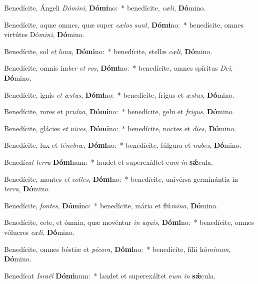 \item Benedícite, Ángeli \textit{Dó}\textit{mi}\textit{ni}, \textbf{Dó}\textbf{mi}no:~* benedícite, \textit{cæ}\textit{li}, \textbf{Dó}mino.
\item Benedícite, aquæ omnes, quæ super \textit{cæ}\textit{los} \textit{sunt}, \textbf{Dó}\textbf{mi}no:~* benedícite, omnes virtútes Dó\textit{mi}\textit{ni}, \textbf{Dó}mino.
\item Benedícite, sol \textit{et} \textit{lu}\textit{na}, \textbf{Dó}\textbf{mi}no:~* benedícite, stellæ \textit{cæ}\textit{li}, \textbf{Dó}mino.
\item Benedícite, omnis im\textit{ber} \textit{et} \textit{ros}, \textbf{Dó}\textbf{mi}no:~* benedícite, omnes spíritus \textit{De}\textit{i}, \textbf{Dó}mino.
\item Benedícite, ignis \textit{et} \textit{æs}\textit{tus}, \textbf{Dó}\textbf{mi}no:~* benedícite, frigus et \textit{æs}\textit{tus}, \textbf{Dó}mino.
\item Benedícite, rores et \textit{pru}\textit{í}\textit{na}, \textbf{Dó}\textbf{mi}no:~* benedícite, gelu et \textit{fri}\textit{gus}, \textbf{Dó}mino.
\item Benedícite, glácies \textit{et} \textit{ni}\textit{ves}, \textbf{Dó}\textbf{mi}no:~* benedícite, noctes et \textit{di}\textit{es}, \textbf{Dó}mino.
\item Benedícite, lux et \textit{té}\textit{ne}\textit{bræ}, \textbf{Dó}\textbf{mi}no:~* benedícite, fúlgura et \textit{nu}\textit{bes}, \textbf{Dó}mino.
\item Benedí\textit{cat} \textit{ter}\textit{ra} \textbf{Dó}\textbf{mi}num:~* laudet et superexáltet e\textit{um} \textit{in} \textbf{sǽ}cula.
\item Benedícite, montes \textit{et} \textit{col}\textit{les}, \textbf{Dó}\textbf{mi}no:~* benedícite, univérsa germinántia in \textit{ter}\textit{ra}, \textbf{Dó}mino.
\item Benedíci\textit{te}, \textit{fon}\textit{tes}, \textbf{Dó}\textbf{mi}no:~* benedícite, mária et flú\textit{mi}\textit{na}, \textbf{Dó}mino.
\item Benedícite, cete, et ómnia, quæ movéntur \textit{in} \textit{a}\textit{quis}, \textbf{Dó}\textbf{mi}no:~* benedícite, omnes vólucres \textit{cæ}\textit{li}, \textbf{Dó}mino.
\item Benedícite, omnes béstiæ et \textit{pé}\textit{co}\textit{ra}, \textbf{Dó}\textbf{mi}no:~* benedícite, fílii hó\textit{mi}\textit{num}, \textbf{Dó}mino.
\item Benedícat \textit{Is}\textit{ra}\textit{ël} \textbf{Dó}\textbf{mi}num:~* laudet et superexáltet e\textit{um} \textit{in} \textbf{sǽ}cula.
